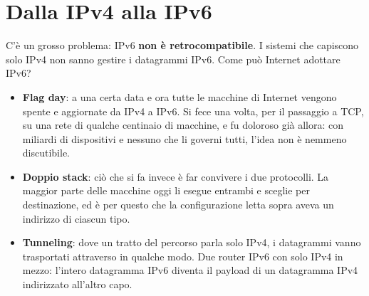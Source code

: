 \section{Dalla IPv4 alla IPv6}

C'è un grosso problema: IPv6 \textbf{non è retrocompatibile}. I sistemi che capiscono solo IPv4 non sanno gestire i datagrammi IPv6.
Come può Internet adottare IPv6?

\begin{itemize}
    \item \textbf{Flag day}: a una certa data e ora tutte le macchine di Internet vengono spente e aggiornate da IPv4 a IPv6. Si
          fece una volta, per il passaggio a TCP, su una rete di qualche centinaio di macchine, e fu doloroso già allora: con
          miliardi di dispositivi e nessuno che li governi tutti, l'idea non è nemmeno discutibile.
    \item \textbf{Doppio stack}: ciò che si fa invece è far convivere i due protocolli. La maggior parte delle macchine oggi li
          esegue entrambi e sceglie per destinazione, ed è per questo che la configurazione letta sopra aveva un indirizzo di
          ciascun tipo.
    \item \textbf{Tunneling}: dove un tratto del percorso parla solo IPv4, i datagrammi vanno trasportati attraverso in qualche
          modo. Due router IPv6 con solo IPv4 in mezzo: l'intero datagramma IPv6 diventa il payload di un datagramma IPv4
          indirizzato all'altro capo.
\end{itemize}

